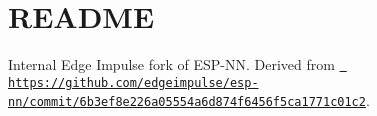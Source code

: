 \chapter{README}
\hypertarget{md__face___access__inferencing_2src_2edge-impulse-sdk_2porting_2espressif_2_e_s_p-_n_n_2_r_e_a_d_m_e}{}\label{md__face___access__inferencing_2src_2edge-impulse-sdk_2porting_2espressif_2_e_s_p-_n_n_2_r_e_a_d_m_e}
Internal Edge Impulse fork of ESP-\/\+NN. Derived from \href{https://github.com/edgeimpulse/esp-nn/commit/6b3ef8e226a05554a6d874f6456f5ca1771c01c2}{\texttt{ https\+://github.\+com/edgeimpulse/esp-\/nn/commit/6b3ef8e226a05554a6d874f6456f5ca1771c01c2}}. 